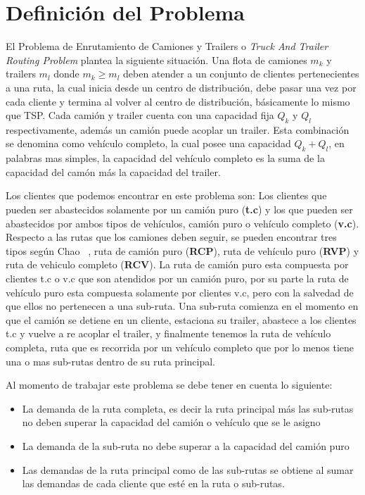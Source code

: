 \documentclass[letter, 10pt]{article}
\begin{document}
\section{Definici\'on del Problema}
\label{Definicion}
El Problema de Enrutamiento de Camiones y Trailers o \textit{Truck And Trailer Routing Problem} plantea la siguiente situaci\'on. Una flota de camiones $m_k$ y trailers $m_l$ donde $m_k \geq m_l$ deben atender a un conjunto de clientes pertenecientes a una ruta, la cual inicia desde un centro de distribuci\'on, debe pasar una vez por cada cliente y termina al  volver al centro de distribuci\'on, básicamente lo mismo que TSP. Cada cami\'on y trailer cuenta con una capacidad fija $Q_k$ y $Q_l$ respectivamente, adem\'as un cami\'on puede acoplar un trailer. Esta combinaci\'on se denomina como veh\'iculo completo, la cual posee una capacidad  $ Q_k + Q_l $, en palabras mas simples, la capacidad del veh\'iculo completo es la suma de la capacidad del cam\'on m\'as la capacidad del trailer. 
 
 Los clientes que podemos encontrar en este problema son: Los clientes que pueden ser abastecidos solamente por un cami\'on puro (\textbf{t.c}) y los que pueden ser abastecidos por ambos tipos de veh\'iculos, cami\'on puro o veh\'iculo completo (\textbf{v.c}).
 Respecto a las rutas que los camiones deben seguir, se pueden encontrar tres tipos según Chao ~\cite{Chao}, ruta de cami\'on puro (\textbf{RCP}), ruta de veh\'iculo puro (\textbf{RVP}) y ruta de vehiculo completo (\textbf{RCV}). La ruta de cami\'on puro esta compuesta por clientes t.c o v.c que son atendidos por un cami\'on puro, por su parte la ruta de veh\'iculo puro esta compuesta solamente por clientes v.c, pero con la salvedad de que ellos no pertenecen a una sub-ruta. Una sub-ruta comienza en el momento en que el cami\'on se detiene en un cliente, estaciona su trailer,  abastece a los clientes t.c y vuelve a re acoplar el trailer, y finalmente tenemos la ruta de veh\'iculo completa, ruta que es recorrida por un veh\'iculo completo que por lo menos tiene una o mas sub-rutas dentro de su ruta principal.  
 
 
Al momento de trabajar este problema se debe tener en cuenta lo siguiente: 

\begin{itemize}
    \item La demanda de la ruta completa, es decir la ruta principal m\'as las sub-rutas no deben superar la capacidad del cami\'on o veh\'iculo que se le asigno
    \item La demanda de la sub-ruta no debe superar a la capacidad del cami\'on puro
    \item Las demandas de la ruta principal como de las sub-rutas se obtiene al sumar las demandas de cada cliente que est\'e en la ruta o sub-rutas.
\end{itemize}
\end{document}
